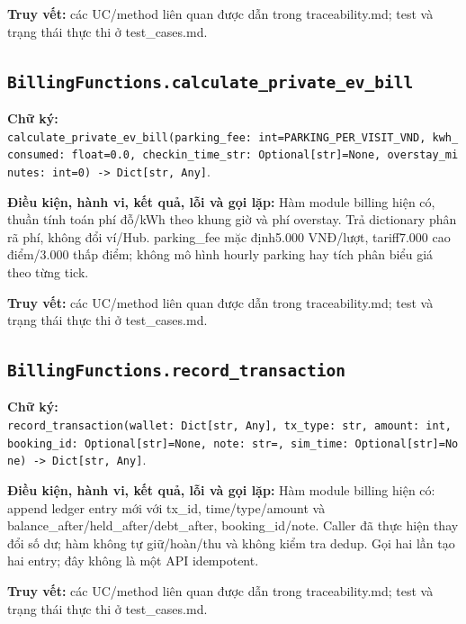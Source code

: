 \documentclass[11pt,a4paper]{article}
\begin{document}
\textbf{Truy vết:} các UC/method liên quan được dẫn trong
traceability.md; test và trạng thái thực thi ở test\_cases.md.

\hypertarget{billingfunctions.calculate_private_ev_bill}{%
\subsection{\texorpdfstring{\texttt{BillingFunctions.calculate\_private\_ev\_bill}}{BillingFunctions.calculate\_private\_ev\_bill}}\label{billingfunctions.calculate_private_ev_bill}}

\textbf{Chữ ký:}
\texttt{calculate\_private\_ev\_bill(parking\_fee:\ int=PARKING\_PER\_VISIT\_VND,\ kwh\_consumed:\ float=0.0,\ checkin\_time\_str:\ Optional{[}str{]}=None,\ overstay\_minutes:\ int=0)\ -\textgreater{}\ Dict{[}str,\ Any{]}}.

\textbf{Điều kiện, hành vi, kết quả, lỗi và gọi lặp:} Hàm module billing
hiện có, thuần tính toán phí đỗ/kWh theo khung giờ và phí overstay. Trả
dictionary phân rã phí, không đổi ví/Hub. parking\_fee mặc định5.000
VNĐ/lượt, tariff7.000 cao điểm/3.000 thấp điểm; không mô hình hourly
parking hay tích phân biểu giá theo từng tick.

\textbf{Truy vết:} các UC/method liên quan được dẫn trong
traceability.md; test và trạng thái thực thi ở test\_cases.md.

\hypertarget{billingfunctions.record_transaction}{%
\subsection{\texorpdfstring{\texttt{BillingFunctions.record\_transaction}}{BillingFunctions.record\_transaction}}\label{billingfunctions.record_transaction}}

\textbf{Chữ ký:}
\texttt{record\_transaction(wallet:\ Dict{[}str,\ Any{]},\ tx\_type:\ str,\ amount:\ int,\ booking\_id:\ Optional{[}str{]}=None,\ note:\ str=\textquotesingle{}\textquotesingle{},\ sim\_time:\ Optional{[}str{]}=None)\ -\textgreater{}\ Dict{[}str,\ Any{]}}.

\textbf{Điều kiện, hành vi, kết quả, lỗi và gọi lặp:} Hàm module billing
hiện có: append ledger entry mới với tx\_id, time/type/amount và
balance\_after/held\_after/debt\_after, booking\_id/note. Caller đã thực
hiện thay đổi số dư; hàm không tự giữ/hoàn/thu và không kiểm tra dedup.
Gọi hai lần tạo hai entry; đây không là một API idempotent.

\textbf{Truy vết:} các UC/method liên quan được dẫn trong
traceability.md; test và trạng thái thực thi ở test\_cases.md.
\end{document}

